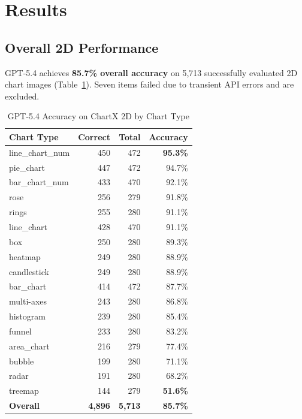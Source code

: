 \documentclass[sigconf, 10pt]{acmart}
\begin{document}
\section{Results}

\subsection{Overall 2D Performance}
GPT-5.4 achieves \textbf{85.7\% overall accuracy} on 5,713 successfully evaluated 2D chart images (Table~\ref{tab:results}). Seven items failed due to transient API errors and are excluded.

\begin{table}[h]
\caption{GPT-5.4 Accuracy on ChartX 2D by Chart Type}
\label{tab:results}
\small
\begin{tabular}{lrrr}
\toprule
\textbf{Chart Type} & \textbf{Correct} & \textbf{Total} & \textbf{Accuracy} \\
\midrule
line\_chart\_num & 450 & 472 & \textbf{95.3\%} \\
pie\_chart & 447 & 472 & 94.7\% \\
bar\_chart\_num & 433 & 470 & 92.1\% \\
rose & 256 & 279 & 91.8\% \\
rings & 255 & 280 & 91.1\% \\
line\_chart & 428 & 470 & 91.1\% \\
box & 250 & 280 & 89.3\% \\
heatmap & 249 & 280 & 88.9\% \\
candlestick & 249 & 280 & 88.9\% \\
bar\_chart & 414 & 472 & 87.7\% \\
multi-axes & 243 & 280 & 86.8\% \\
histogram & 239 & 280 & 85.4\% \\
funnel & 233 & 280 & 83.2\% \\
\midrule
area\_chart & 216 & 279 & 77.4\% \\
bubble & 199 & 280 & 71.1\% \\
radar & 191 & 280 & 68.2\% \\
treemap & 144 & 279 & \textbf{51.6\%} \\
\midrule
\textbf{Overall} & \textbf{4,896} & \textbf{5,713} & \textbf{85.7\%} \\
\bottomrule
\end{tabular}
\end{table}
\end{document}
